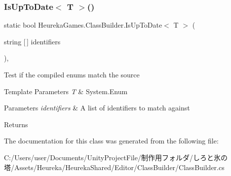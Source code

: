 \subsubsection{\texorpdfstring{Is\+Up\+To\+Date$<$ T $>$()}{IsUpToDate< T >()}}
{\footnotesize\ttfamily static bool Heureka\+Games.\+Class\+Builder.\+Is\+Up\+To\+Date$<$ T $>$ (\begin{DoxyParamCaption}\item[{string \mbox{[}$\,$\mbox{]}}]{identifiers }\end{DoxyParamCaption})\hspace{0.3cm}{\ttfamily [inline]}, {\ttfamily [static]}}



Test if the compiled enums match the source 


\begin{DoxyTemplParams}{Template Parameters}
{\em T} & System.\+Enum\\
\hline
\end{DoxyTemplParams}

\begin{DoxyParams}{Parameters}
{\em identifiers} & A list of identifiers to match against\\
\hline
\end{DoxyParams}
\begin{DoxyReturn}{Returns}

\end{DoxyReturn}


The documentation for this class was generated from the following file\+:\begin{DoxyCompactItemize}
\item 
C\+:/\+Users/user/\+Documents/\+Unity\+Project\+File/制作用フォルダ/しろと氷の塔/\+Assets/\+Heureka/\+Heureka\+Shared/\+Editor/\+Class\+Builder/Class\+Builder.\+cs\end{DoxyCompactItemize}

